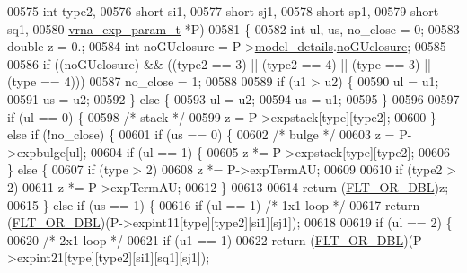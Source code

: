 \begin{DoxyCode}
00575               \textcolor{keywordtype}{int}               type2,
00576               \textcolor{keywordtype}{short}             si1,
00577               \textcolor{keywordtype}{short}             sj1,
00578               \textcolor{keywordtype}{short}             sp1,
00579               \textcolor{keywordtype}{short}             sq1,
00580               \hyperlink{group__energy__parameters_structvrna__exp__param__s}{vrna\_exp\_param\_t}  *P)
00581 \{
00582   \textcolor{keywordtype}{int}     ul, us, no\_close = 0;
00583   \textcolor{keywordtype}{double}  z           = 0.;
00584   \textcolor{keywordtype}{int}     noGUclosure = P->\hyperlink{group__energy__parameters_ac18055127bccc27c1223f1d2f3b01b53}{model\_details}.\hyperlink{group__model__details_a7e883db1f33f8f3baa5c9b140350c78e}{noGUclosure};
00585 
00586   \textcolor{keywordflow}{if} ((noGUclosure) && ((type2 == 3) || (type2 == 4) || (type == 3) || (type == 4)))
00587     no\_close = 1;
00588 
00589   \textcolor{keywordflow}{if} (u1 > u2) \{
00590     ul  = u1;
00591     us  = u2;
00592   \} \textcolor{keywordflow}{else} \{
00593     ul  = u2;
00594     us  = u1;
00595   \}
00596 
00597   \textcolor{keywordflow}{if} (ul == 0) \{
00598     \textcolor{comment}{/* stack */}
00599     z = P->expstack[type][type2];
00600   \} \textcolor{keywordflow}{else} \textcolor{keywordflow}{if} (!no\_close) \{
00601     \textcolor{keywordflow}{if} (us == 0) \{
00602       \textcolor{comment}{/* bulge */}
00603       z = P->expbulge[ul];
00604       \textcolor{keywordflow}{if} (ul == 1) \{
00605         z *= P->expstack[type][type2];
00606       \} \textcolor{keywordflow}{else} \{
00607         \textcolor{keywordflow}{if} (type > 2)
00608           z *= P->expTermAU;
00609 
00610         \textcolor{keywordflow}{if} (type2 > 2)
00611           z *= P->expTermAU;
00612       \}
00613 
00614       \textcolor{keywordflow}{return} (\hyperlink{group__data__structures_ga31125aeace516926bf7f251f759b6126}{FLT\_OR\_DBL})z;
00615     \} \textcolor{keywordflow}{else} \textcolor{keywordflow}{if} (us == 1) \{
00616       \textcolor{keywordflow}{if} (ul == 1)                     \textcolor{comment}{/* 1x1 loop */}
00617         \textcolor{keywordflow}{return} (\hyperlink{group__data__structures_ga31125aeace516926bf7f251f759b6126}{FLT\_OR\_DBL})(P->expint11[type][type2][si1][sj1]);
00618 
00619       \textcolor{keywordflow}{if} (ul == 2) \{
00620         \textcolor{comment}{/* 2x1 loop */}
00621         \textcolor{keywordflow}{if} (u1 == 1)
00622           \textcolor{keywordflow}{return} (\hyperlink{group__data__structures_ga31125aeace516926bf7f251f759b6126}{FLT\_OR\_DBL})(P->expint21[type][type2][si1][sq1][sj1]);

\end{DoxyCode}
